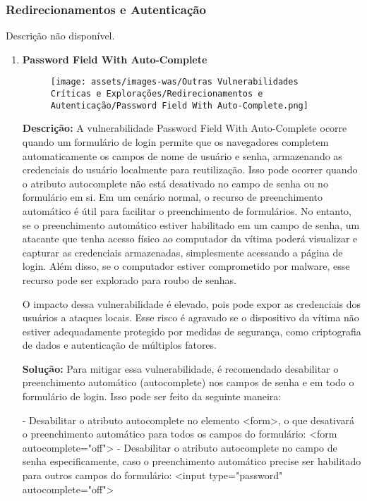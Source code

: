 \documentclass[a4paper,12pt]{article}
\begin{document}
\subsubsection{Redirecionamentos e Autenticação}
Descrição não disponível.

\begin{enumerate}
\item \textbf{Password Field With Auto-Complete}

                        \begin{figure}[h!]
                        \centering
                        \texttt{[image: assets/images-was/Outras Vulnerabilidades Críticas e Explorações/Redirecionamentos e Autenticação/Password Field With Auto-Complete.png]}
                        \end{figure}
                        \FloatBarrier
                        \textbf{Descrição:} A vulnerabilidade Password Field With Auto-Complete ocorre quando um formulário de login permite que os navegadores completem automaticamente os campos de nome de usuário e senha, armazenando as credenciais do usuário localmente para reutilização. Isso pode ocorrer quando o atributo autocomplete não está desativado no campo de senha ou no formulário em si.
Em um cenário normal, o recurso de preenchimento automático é útil para facilitar o preenchimento de formulários. No entanto, se o preenchimento automático estiver habilitado em um campo de senha, um atacante que tenha acesso físico ao computador da vítima poderá visualizar e capturar as credenciais armazenadas, simplesmente acessando a página de login. Além disso, se o computador estiver comprometido por malware, esse recurso pode ser explorado para roubo de senhas.

O impacto dessa vulnerabilidade é elevado, pois pode expor as credenciais dos usuários a ataques locais. Esse risco é agravado se o dispositivo da vítima não estiver adequadamente protegido por medidas de segurança, como criptografia de dados e autenticação de múltiplos fatores.

\textbf{Solução:} Para mitigar essa vulnerabilidade, é recomendado desabilitar o preenchimento automático (autocomplete) nos campos de senha e em todo o formulário de login. Isso pode ser feito da seguinte maneira:

- Desabilitar o atributo autocomplete no elemento <form>, o que desativará o preenchimento automático para todos os campos do formulário: <form autocomplete="off">
- Desabilitar o atributo autocomplete no campo de senha especificamente, caso o preenchimento automático precise ser habilitado para outros campos do formulário: <input type="password" autocomplete="off">


\end{enumerate}
\end{document}
